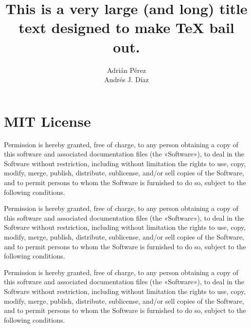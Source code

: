 \documentclass[11pt]{connectical}
\title{
	This is a very large (and long) title text designed to make TeX bail out.
}
\author{
	Adrián Pérez \amail{moebius@connectical.net} \\
	Andrés J. Díaz \amail{ajdiaz@connectical.net}
}
\begin{document}
\maketitle
\tableofcontents

\section{MIT License}

Permission is hereby granted, free of charge, to any person obtaining a
copy of this software and associated documentation files (the «Software»),
to deal in the Software without restriction, including without limitation
the rights to use, copy, modify, merge, publish, distribute, sublicense,
and/or sell copies of the Software, and to permit persons to whom the
Software is furnished to do so, subject to the following conditions.

Permission is hereby granted, free of charge, to any person obtaining a
copy of this software and associated documentation files (the «Software»),
to deal in the Software without restriction, including without limitation
the rights to use, copy, modify, merge, publish, distribute, sublicense,
and/or sell copies of the Software, and to permit persons to whom the
Software is furnished to do so, subject to the following conditions.

Permission is hereby granted, free of charge, to any person obtaining a
copy of this software and associated documentation files (the «Software»),
to deal in the Software without restriction, including without limitation
the rights to use, copy, modify, merge, publish, distribute, sublicense,
and/or sell copies of the Software, and to permit persons to whom the
Software is furnished to do so, subject to the following conditions.
\end{document}
